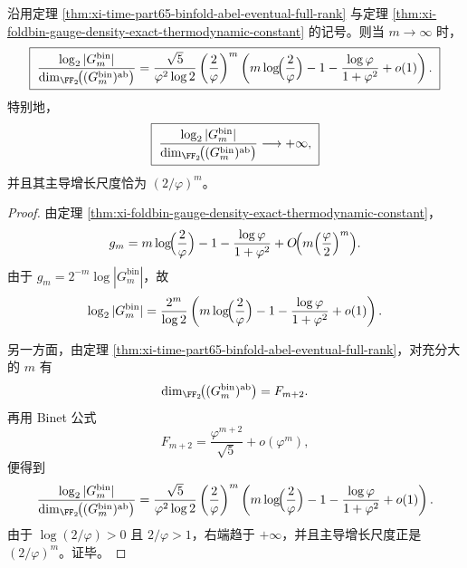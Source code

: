 \begin{theorem}[规范群复杂度相对异常维数的指数超载律]\label{thm:xi-time-part65-gauge-complexity-anomaly-overload}
沿用定理 \ref{thm:xi-time-part65-binfold-abel-eventual-full-rank} 与定理 \ref{thm:xi-foldbin-gauge-density-exact-thermodynamic-constant} 的记号。则当 \(m\to\infty\) 时，
\[
\boxed{\;
\frac{\log_2|G_m^{\mathrm{bin}}|}
{\dim_{\FF_2}\!\bigl((G_m^{\mathrm{bin}})^{\mathrm{ab}}\bigr)}
=
\frac{\sqrt5}{\varphi^2\log 2}
\left(\frac{2}{\varphi}\right)^m
\left(
m\log\!\Bigl(\frac{2}{\varphi}\Bigr)
-1-\frac{\log\varphi}{1+\varphi^2}
+o(1)
\right).\;}
\]
特别地，
\[
\boxed{\;
\frac{\log_2|G_m^{\mathrm{bin}}|}
{\dim_{\FF_2}\!\bigl((G_m^{\mathrm{bin}})^{\mathrm{ab}}\bigr)}
\longrightarrow +\infty,\;}
\]
并且其主导增长尺度恰为 \((2/\varphi)^m\)。
\end{theorem}
\begin{proof}
由定理 \ref{thm:xi-foldbin-gauge-density-exact-thermodynamic-constant}，
\[
g_m
=
m\log\!\Bigl(\frac{2}{\varphi}\Bigr)
-1-\frac{\log\varphi}{1+\varphi^2}
+O\!\Bigl(m\Bigl(\frac{\varphi}{2}\Bigr)^m\Bigr).
\]
由于 \(g_m=2^{-m}\log|G_m^{\mathrm{bin}}|\)，故
\[
\log_2|G_m^{\mathrm{bin}}|
=
\frac{2^m}{\log 2}
\left(
m\log\!\Bigl(\frac{2}{\varphi}\Bigr)
-1-\frac{\log\varphi}{1+\varphi^2}
+o(1)
\right).
\]

另一方面，由定理 \ref{thm:xi-time-part65-binfold-abel-eventual-full-rank}，对充分大的 \(m\) 有
\[
\dim_{\FF_2}\!\bigl((G_m^{\mathrm{bin}})^{\mathrm{ab}}\bigr)=F_{m+2}.
\]
再用 Binet 公式
\[
F_{m+2}=\frac{\varphi^{m+2}}{\sqrt5}+o(\varphi^m),
\]
便得到
\[
\frac{\log_2|G_m^{\mathrm{bin}}|}
{\dim_{\FF_2}\!\bigl((G_m^{\mathrm{bin}})^{\mathrm{ab}}\bigr)}
=
\frac{\sqrt5}{\varphi^2\log 2}
\left(\frac{2}{\varphi}\right)^m
\left(
m\log\!\Bigl(\frac{2}{\varphi}\Bigr)
-1-\frac{\log\varphi}{1+\varphi^2}
+o(1)
\right).
\]
由于 \(\log(2/\varphi)>0\) 且 \(2/\varphi>1\)，右端趋于 \(+\infty\)，并且主导增长尺度正是 \((2/\varphi)^m\)。证毕。
\end{proof}

